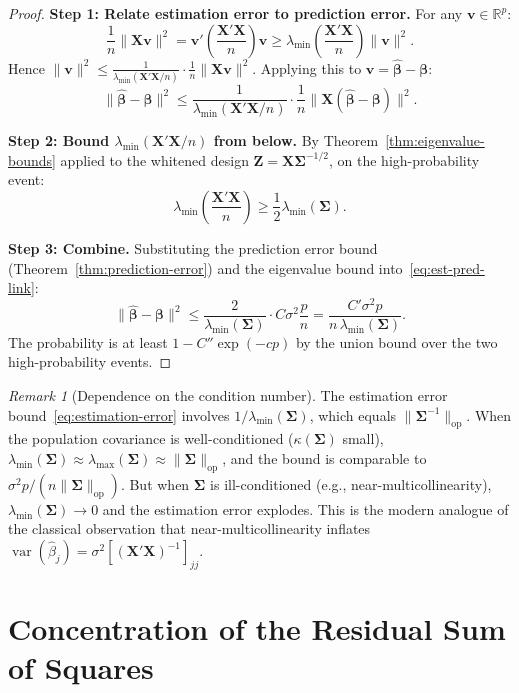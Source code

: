 \documentclass[14pt]{extarticle}
\theoremstyle{plain}
\theoremstyle{definition}
\theoremstyle{remark}
\newtheorem*{remark}{Remark}
\DeclareMathOperator\var{var}
\newcommand{\bX}{\mathbf{X}}
\def\bb{\boldsymbol{\beta}}
\newcommand{\bZ}{\mathbf{Z}}
\newcommand{\bv}{\mathbf{v}}
\newcommand{\Real}{\mathbb{R}}
\newcommand{\bSigma}{\boldsymbol{\Sigma}}
\newcommand{\hbb}{\hat{\boldsymbol{\beta}}}
\newcommand{\opnorm}[1]{\|#1\|_{\mathrm{op}}}
\begin{document}
\begin{proof}
\textbf{Step 1: Relate estimation error to prediction error.} For any $\bv \in \Real^p$:
\[
\frac{1}{n}\|\bX\bv\|^2 = \bv'\!\left(\frac{\bX'\bX}{n}\right)\bv \geqslant \lambda_{\min}\!\left(\frac{\bX'\bX}{n}\right)\|\bv\|^2.
\]
Hence $\|\bv\|^2 \leqslant \frac{1}{\lambda_{\min}(\bX'\bX/n)}\cdot\frac{1}{n}\|\bX\bv\|^2$. Applying this to $\bv = \hbb - \bb$:
\begin{equation}\label{eq:est-pred-link}
\|\hbb - \bb\|^2 \leqslant \frac{1}{\lambda_{\min}(\bX'\bX/n)}\cdot\frac{1}{n}\|\bX(\hbb - \bb)\|^2.
\end{equation}

\textbf{Step 2: Bound $\lambda_{\min}(\bX'\bX/n)$ from below.} By Theorem~\ref{thm:eigenvalue-bounds} applied to the whitened design $\bZ = \bX\bSigma^{-1/2}$, on the high-probability event:
\[
\lambda_{\min}\!\left(\frac{\bX'\bX}{n}\right) \geqslant \frac{1}{2}\lambda_{\min}(\bSigma).
\]

\textbf{Step 3: Combine.} Substituting the prediction error bound (Theorem~\ref{thm:prediction-error}) and the eigenvalue bound into~\eqref{eq:est-pred-link}:
\[
\|\hbb - \bb\|^2 \leqslant \frac{2}{\lambda_{\min}(\bSigma)}\cdot C\sigma^2\frac{p}{n} = \frac{C'\sigma^2 p}{n\,\lambda_{\min}(\bSigma)}.
\]
The probability is at least $1 - C''\exp(-cp)$ by the union bound over the two high-probability events.
\end{proof}

\begin{remark}[Dependence on the condition number]
The estimation error bound~\eqref{eq:estimation-error} involves $1/\lambda_{\min}(\bSigma)$, which equals $\opnorm{\bSigma^{-1}}$. When the population covariance is well-conditioned ($\kappa(\bSigma)$ small), $\lambda_{\min}(\bSigma) \approx \lambda_{\max}(\bSigma) \approx \|\bSigma\|_{\mathrm{op}}$, and the bound is comparable to $\sigma^2 p/(n\opnorm{\bSigma})$. But when $\bSigma$ is ill-conditioned (e.g., near-multicollinearity), $\lambda_{\min}(\bSigma) \to 0$ and the estimation error explodes. This is the modern analogue of the classical observation that near-multicollinearity inflates $\var(\hat{\beta}_j) = \sigma^2[(\bX'\bX)^{-1}]_{jj}$.
\end{remark}

\section{Concentration of the Residual Sum of Squares}\label{sec:sse-concentration}
\end{document}
